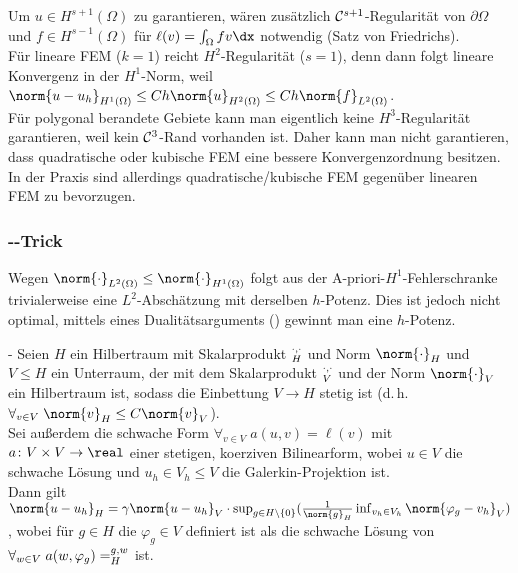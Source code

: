 \linie

\begin{Bem}
    Um $u \in H^{s+1}(\Omega)$ zu garantieren, wären zusätzlich
    $\mathcal{C}^{s+1}$-Regularität von $\partial\Omega$ und $f \in H^{s-1}(\Omega)$ für
    $\ell(v) = \int_\Omega fv \dx$ notwendig (Satz von Friedrichs).\\
    Für lineare FEM ($k = 1$) reicht $H^2$-Regularität ($s = 1$),
    denn dann folgt lineare Konvergenz in der $H^1$-Norm, weil
    $\norm{u - u_h}_{H^1(\Omega)} \le Ch\norm{u}_{H^2(\Omega)} \le Ch\norm{f}_{L^2(\Omega)}$.\\
    Für polygonal berandete Gebiete kann man eigentlich keine $H^3$-Regularität garantieren,
    weil kein $\mathcal{C}^3$-Rand vorhanden ist.
    Daher kann man nicht garantieren, dass quadratische oder kubische FEM eine bessere
    Konvergenzordnung besitzen.
    In der Praxis sind allerdings quadratische/kubische FEM gegenüber linearen FEM
    zu bevorzugen.
\end{Bem}

\subsubsection{%
    --Trick%
}

\begin{Bem}
    Wegen $\norm{\cdot}_{L^2(\Omega)} \le \norm{\cdot}_{H^1(\Omega)}$
    folgt aus der A-priori-$H^1$-Fehlerschranke trivialerweise eine $L^2$-Abschätzung
    mit derselben $h$-Potenz.
    Dies ist jedoch nicht optimal, mittels eines Dualitätsarguments
    () gewinnt man eine $h$-Potenz.
\end{Bem}

\begin{Satz}{-}
    Seien $H$ ein Hilbertraum mit Skalarprodukt $\sp{\cdot, \cdot}_H$ und Norm $\norm{\cdot}_H$
    und $V \le H$ ein Unterraum, der mit dem Skalarprodukt
    $\sp{\cdot, \cdot}_V$ und der Norm $\norm{\cdot}_V$ ein Hilbertraum ist,
    sodass die Einbettung $V \to H$ stetig ist
    (d.\,h. $\forall_{v \in V}\; \norm{v}_H \le C \norm{v}_V$).\\
    Sei außerdem die schwache Form $\forall_{v \in V}\; a(u, v) = \ell(v)$
    mit $a\colon V \times V \to \real$ einer stetigen, koerziven Bilinearform,
    wobei $u \in V$ die schwache Lösung und $u_h \in V_h \le V$
    die Galerkin-Projektion ist.\\
    Dann gilt $\norm{u - u_h}_H = \gamma \norm{u - u_h}_V \cdot
    \sup_{g \in H \setminus \{0\}} (\frac{1}{\norm{g}_H} \inf_{v_h \in V_h}
    \norm{\varphi_g - v_h}_V)$,
    wobei für $g \in H$ die  $\varphi_g \in V$ definiert ist als
    die schwache Lösung von $\forall_{w \in V}\; a(w, \varphi_g) = \sp{g, w}_H$ ist.
\end{Satz}

